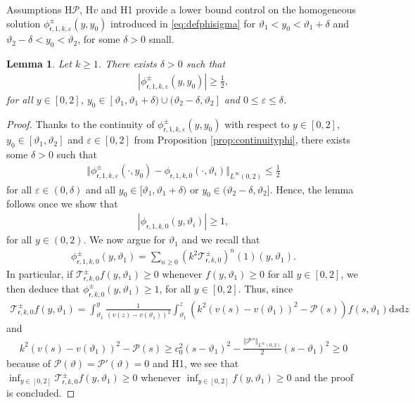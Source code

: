 \documentclass[11pt,reqno]{amsproc}
\newtheorem{lemma}[proposition]{Lemma}
\theoremstyle{definition}
\numberwithin{equation}{section}
\newcommand{\sr}{{\mathsf{r}}}
\newcommand{\cT}{{\mathcal T}}
\renewcommand{\d}{\mathrm{d}}
\newcommand{\ep}{\varepsilon}
\renewcommand{\P}{{\mathcal{P}}}
\begin{document}
Assumptions {H$\P$, H$v$} and H1 provide a lower bound control on the homogeneous solution $\phi_{\sr,1,k,\ep}^\pm(y,y_0)$ introduced in \eqref{eq:defphisigma} for $\vartheta_1 < y_0 < \vartheta_1 + \delta$ and $\vartheta_2 - \delta < y_0 < \vartheta_2$, for some $\delta>0$ small.

\begin{lemma}\label{lemma:lowerboundphisigma}
Let $k\geq 1$. There exists $\delta>0$ such that 
\begin{align*}
\left| \phi_{\sr,1,k,\ep}^\pm(y,y_0) \right| \geq \frac12, 
\end{align*} 
for all $y\in[0,2]$, $y_0\in [\vartheta_1, \vartheta_1+\delta) \cup (\vartheta_2 - \delta, \vartheta_2]$ and $0 \leq \ep \leq \delta$.
\end{lemma}

\begin{proof}
Thanks to the continuity of $\phi_{\sr,1,k,\ep}^\pm(y,y_0)$ with respect to $y\in[0,2]$, $y_0\in [\vartheta_1, \vartheta_2]$ and $\ep\in [0,2]$ from Proposition \ref{prop:continuityphi}, there exists some $\delta>0$ such that
\begin{align*}
\Vert \phi_{\sr,1,k,\ep}^\pm(\cdot, y_0) - \phi_{\sr,1,k,0}(\cdot, \vartheta_i)\Vert_{L^\infty(0,2)} \leq \frac12 
\end{align*}
for all $\ep\in (0,\delta)$ and all $y_0\in [\vartheta_1, \vartheta_1 + \delta)$ or $y_0\in (\vartheta_2-\delta, \vartheta_2]$. Hence, the lemma follows once we show that
\begin{align*}
\left| \phi_{\sr,1,k,0}(y, \vartheta_i) \right| \geq 1,
\end{align*}
for all $y\in(0,2)$. We now argue for $\vartheta_1$ and we recall that
\begin{align*}
\phi_{\sr,1,k,0}^\pm(y,\vartheta_1) = \sum_{n\geq 0} \left( k^2 \cT_{\sr,k,0}^\pm \right)^n(1)(y,\vartheta_1).
\end{align*}
In particular, if $\cT_{\sr,k,0}^\pm f(y,\vartheta_1)\geq 0$ whenever $f(y,\vartheta_1)\geq 0$ for all $y\in [0,2]$, we then deduce that $\phi_{\sr,k,0}^\pm(y,\vartheta_1)\geq 1$, for all $y\in[0,2]$. Thus, since
\begin{align*}
\cT_{\sr,k,0}^\pm f(y,\vartheta_1) = \int_{\vartheta_1}^y \frac{1}{(v(z) - v(\vartheta_1))^2}\int_{\vartheta_1}^z \left( k^2(v(s) - v(\vartheta_1))^2 - \P(s) \right) f(s,\vartheta_1) \d s \d z
\end{align*} 
and 
\begin{align*}
k^2(v(s) - v(\vartheta_1))^2 - \P(s) \geq c_0^2 (s-\vartheta_1)^2 - \frac{\Vert \P'' \Vert_{L^\infty(0,2)}}{2}(s-\vartheta_1)^2 \geq 0
\end{align*}
because of $\P(\vartheta) = \P'(\vartheta) = 0$ and H1, we see that $\inf_{y\in[0,2]}\cT_{\sr,k,0}^\pm f(y,\vartheta_1)\geq 0$ whenever $\inf_{y\in[0,2]} f(y,\vartheta_1)\geq 0$ and the proof is concluded.
\end{proof}
\end{document}
